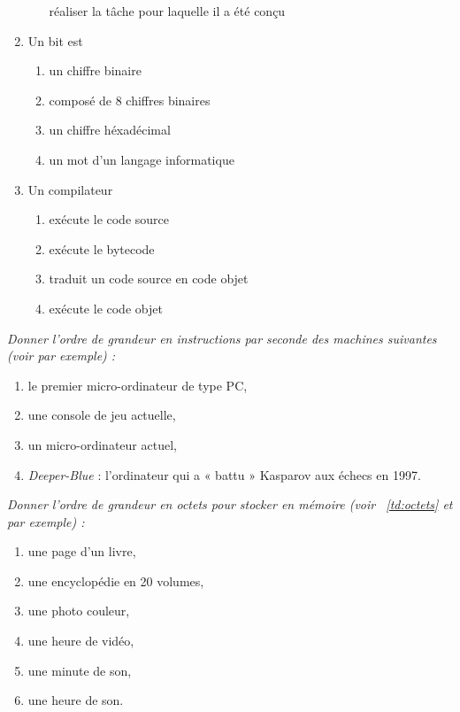 \begin{td}[QCM (1)]
\begin{enumerate}
\begin{enumerate}
		réaliser la tâche pour laquelle il a été conçu
	\end{enumerate}
\item Un bit est 
	\begin{enumerate}
	\item un chiffre binaire
	\item composé de 8 chiffres binaires
	\item un chiffre héxadécimal
	\item un mot d'un langage informatique
	\end{enumerate}
\item Un compilateur 
	\begin{enumerate}
	\item exécute le code source
	\item exécute le bytecode
	\item traduit un code source en code objet
	\item exécute le code objet
	\end{enumerate}
\end{enumerate}
\end{td}

\begin{td}\label{td:mips}
\em
Donner l'ordre de grandeur en instructions par seconde des machines suivantes 
(voir \cite{delahaye} par exemple) :
\begin{enumerate}
\item le premier micro-ordinateur de type PC,
\item une console de jeu actuelle,
\item un micro-ordinateur actuel,
\item {\em Deeper-Blue} : l'ordinateur qui a « battu » Kasparov aux échecs en 1997.
\end{enumerate}
\end{td}

\begin{td}\label{td:stock}
\em
Donner l'ordre de grandeur en octets pour stocker en mémoire
(voir \tdir\ \ref{td:octets} et \cite{delahaye} par exemple) :
\begin{enumerate}
\item une page d'un livre,
\item une encyclopédie en 20 volumes,
\item une photo couleur,
\item une heure de vidéo,
\item une minute de son,
\item une heure de son.
\end{enumerate}
\end{td}

